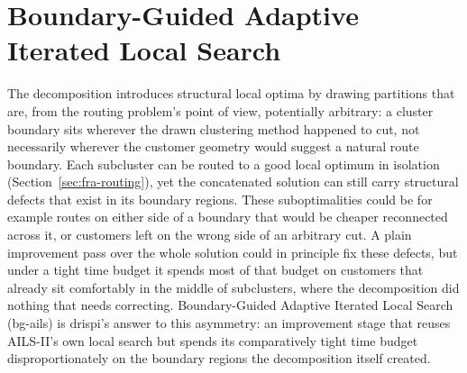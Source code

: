 \section{Boundary-Guided Adaptive Iterated Local Search}\label{sec:fra-bg-ails}
The decomposition introduces structural local optima by drawing partitions that are, from the routing problem's point of view, potentially arbitrary: a cluster boundary sits wherever the drawn clustering method happened to cut, not necessarily wherever the customer geometry would suggest a natural route boundary. Each subcluster can be routed to a good local optimum in isolation (Section~\ref{sec:fra-routing}), yet the concatenated solution can still carry structural defects that exist in its boundary regions. These suboptimalities could be for example routes on either side of a boundary that would be cheaper reconnected across it, or customers left on the wrong side of an arbitrary cut. A plain improvement pass over the whole solution could in principle fix these defects, but under a tight time budget it spends most of that budget on customers that already sit comfortably in the middle of subclusters, where the decomposition did nothing that needs correcting. Boundary-Guided Adaptive Iterated Local Search (\gls{bg-ails}) is \gls{drispi}'s answer to this asymmetry: an improvement stage that reuses AILS-II's own local search but spends its comparatively tight time budget disproportionately on the boundary regions the decomposition itself created.

